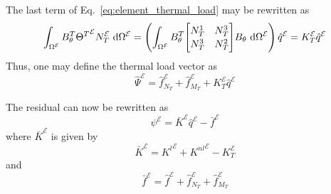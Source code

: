 \documentclass[12pt]{article}
\numberwithin{equation}{section}
\def\el{{ \mathcal{E} }}
\begin{document}
% 
The last term of Eq.~\eqref{eq:element_thermal_load} may be rewritten as
% 
\begin{equation}
    \int_{\Omega^\el} B_\theta^T {\Theta^T}^\el  N_T^\el ~ \text{d}\Omega^\el
    =
    \left(
    \int_{\Omega^\el}
    B_\theta^T
    {\renewcommand\arraystretch{1.15}
        \begin{bmatrix}
            N_T^1 & N_T^3 \\
            N_T^3 & N_T^2
        \end{bmatrix}
    }
    B_\theta ~ \text{d}\Omega^\el
    \right) \hat{q}^\el
    = K_T^\el \hat{q}^\el
\end{equation}
% 
Thus, one may define the thermal load vector as
% 
\begin{equation}
    \hat{\Psi}^\el = \hat{f}^\el_{{N}_T} + \hat{f}^\el_{{M}_T} + K_T^\el \hat{q}^\el
\end{equation}

The residual can now be rewritten as
% 
\begin{equation}
    \psi^\el = \bar{K}^\el \hat{q}^\el - \bar{f}^\el
    \label{eq:residual_2}
\end{equation}
% 
where \(\bar{K}^\el\) is given by
% 
\begin{equation}
    \bar{K}^\el = {K^l}^\el + {K^{nl}}^\el - K_T^\el
\end{equation}
% 
and
% 
\begin{equation}
    \bar{f}^\el =
    \hat{f}^\el +
    \hat{f}^\el_{{N}_T} +
    \hat{f}^\el_{{M}_T}
\end{equation}
\end{document}
